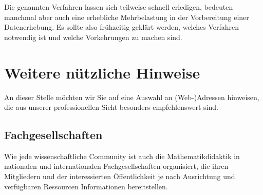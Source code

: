 \documentclass[ngerman,oneside,12pt,a4paper]{scrbook}
\begin{document}
Die genannten Verfahren lassen sich teilweise schnell erledigen,
bedeuten manchmal aber auch eine erhebliche Mehrbelastung in der
Vorbereitung einer Datenerhebung. Es sollte also frühzeitig geklärt
werden, welches Verfahren notwendig ist und welche Vorkehrungen zu
machen sind.

\chapter{Weitere nützliche Hinweise}\label{weitere-nutzliche-hinweise}

An dieser Stelle möchten wir Sie auf eine Auswahl an (Web-)Adressen
hinweisen, die aus unserer professionellen Sicht besonders
empfehlenswert sind.

\section{Fachgesellschaften}\label{fachgesellschaften}

Wie jede wissenschaftliche Community ist auch die Mathematikdidaktik in
nationalen und internationalen Fachgesellschaften organisiert, die ihren
Mitgliedern und der interessierten Öffentlichkeit je nach Ausrichtung
und verfügbaren Ressourcen Informationen bereitstellen.
\end{document}
